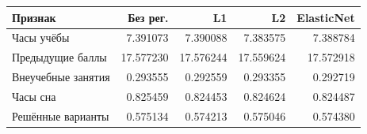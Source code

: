 \begin{tabular}{lrrrr}
\toprule
Признак & Без рег. & L1 & L2 & ElasticNet \\
\midrule
Часы учёбы & 7.391073 & 7.390088 & 7.383575 & 7.388784 \\
Предыдущие баллы & 17.577230 & 17.576244 & 17.559624 & 17.572918 \\
Внеучебные занятия & 0.293555 & 0.292559 & 0.293355 & 0.292719 \\
Часы сна & 0.825459 & 0.824453 & 0.824624 & 0.824487 \\
Решённые варианты & 0.575134 & 0.574213 & 0.575046 & 0.574380 \\
\bottomrule
\end{tabular}
